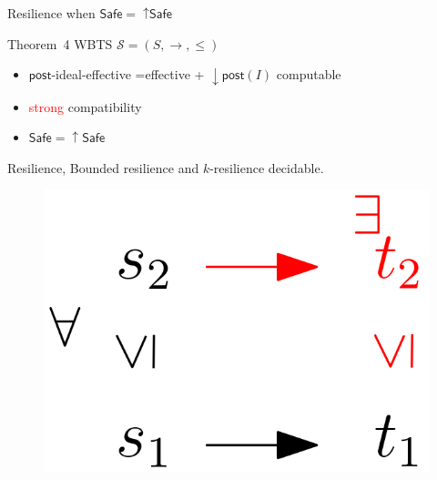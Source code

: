 \documentclass{beamer}
\newcommand{\post}{\textsf{post}}
\newcommand{\Safe}{\textsf{Safe}}
\begin{document}
  \begin{frame}{Resilience when $\Safe = {\uparrow \Safe}$}
   




\begin{block}{Theorem~4}
WBTS $\mathscr{S}=(S,\rightarrow, \leq)$ 
\begin{itemize}
\item $\post$-ideal-effective =effective + $\mathop{\downarrow} \post(I)$ computable %
\item \textcolor{red}{strong} compatibility
\item $\Safe = \mathop{\uparrow} \Safe$
\end{itemize}
{\sc Resilience}, {\sc Bounded resilience} 
and {\sc $k$-resilience} decidable.
\end{block}


\begin{center}
 	\begin{figure}
\includegraphics[width=.25\textwidth]{WSTS_strong}
	\end{figure}
\end{center}  

       \end{frame}
\end{document}
